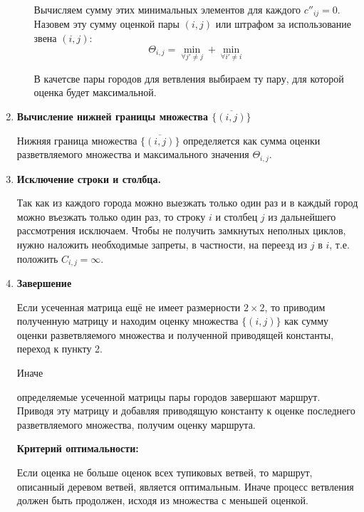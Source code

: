 \documentclass[17pt]{extarticle}
\begin{document}
\begin{enumerate}
\begin{itemize}
                    Вычисляем сумму этих минимальных элементов для каждого \(c''_{ij} = 0\).
                    Назовем эту сумму оценкой пары \((i,j)\) или штрафом за использование звена \((i,j)\):
                    \[
                        \Theta_{i,j} = \mathop{\min{c''_{i,j'}}} \limits_{\forall j' \neq j} + \mathop{\min{c''_{i',j}}} \limits_{\forall i' \neq i}
                    \]

                    В качетсве пары городов для ветвления выбираем ту пару, для которой оценка будет максимальной.
          \end{itemize}

    \item \textbf{Вычисление нижней границы множества \(\{\overline{(i, j)}\}\)}

          Нижняя граница множества \(\{\overline{(i, j)}\}\) определяется как сумма оценки разветвляемого множества и максимального значения \(\Theta_{i,j}\).
    \item \textbf{Исключение строки и столбца.}

          Так как из каждого города можно выезжать только один раз и в каждый город можно въезжать только один раз, то строку \(i\) и столбец \(j\) из дальнейшего рассмотрения исключаем.
          Чтобы не получить замкнутых неполных циклов, нужно наложить необходимые запреты, в частности, на переезд из \(j\) в \(i\), т.е. положить \(C_{i,j} = \infty\).
    \item \textbf{Завершение}

          Если усеченная матрица ещё не имеет размерности \(2 \times 2\),
          то приводим полученную матрицу и находим оценку множества \(\{(i, j)\}\) как сумму оценки разветвляемого множества и полученной приводящей константы, переход к пункту 2.

          Иначе

          определяемые усеченной матрицы пары городов завершают маршрут.
          Приводя эту матрицу и добавляя приводящую константу к оценке последнего разветвляемого множества, получим оценку маршрута.

          \textbf{Критерий оптимальности:}

          Если оценка не больше оценок всех тупиковых ветвей, то маршрут, описанный деревом ветвей, является оптимальным.
          Иначе процесс ветвления должен быть продолжен, исходя из множества с меньшей оценкой.



\end{enumerate}
\end{document}
